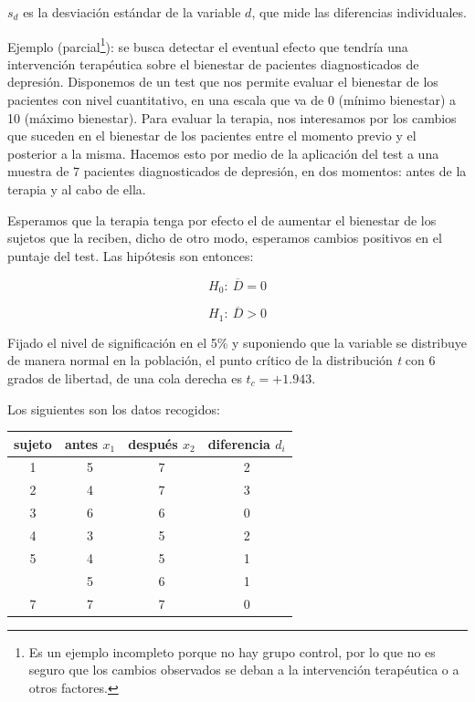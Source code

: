 \documentclass[]{book}
\let\rmarkdownfootnote\footnote%
\def\footnote{\protect\rmarkdownfootnote}
\begin{document}
\(s_{d}\) es la desviación estándar de la variable \(d\), que mide las
diferencias individuales.

Ejemplo (parcial\footnote{Es un ejemplo incompleto porque no hay grupo control, por lo que no es seguro que los cambios observados se deban a la intervención terapéutica o a otros factores.}): se busca detectar el eventual efecto que
tendría una intervención terapéutica sobre el bienestar de pacientes
diagnosticados de depresión. Disponemos de un test que nos permite
evaluar el bienestar de los pacientes con nivel cuantitativo, en una
escala que va de 0 (mínimo bienestar) a 10 (máximo bienestar). Para
evaluar la terapia, nos interesamos por los cambios que suceden en el
bienestar de los pacientes entre el momento previo y el posterior a la
misma. Hacemos esto por medio de la aplicación del test a una muestra de
7 pacientes diagnosticados de depresión, en dos momentos: antes de la
terapia y al cabo de ella.

Esperamos que la terapia tenga por efecto el de aumentar el bienestar de
los sujetos que la reciben, dicho de otro modo, esperamos cambios
positivos en el puntaje del test. Las hipótesis son entonces:

\[H_{0}:\ \overline{D} = 0\]

\[H_{1}:\ \overline{D} > 0\]

Fijado el nivel de significación en el 5\% y suponiendo que la variable
se distribuye de manera normal en la población, el punto crítico de la
distribución \emph{t} con 6 grados de libertad, de una cola derecha es
\(t_{c} =+1.943\).

Los siguientes son los datos recogidos:

\begin{table}[H]
\centering
\begin{tabular}{cccc}
\toprule
sujeto & antes $x_1$ & después $x_2$ & diferencia $d_i$\\
\midrule
\rowcolor{gray!6}  1 & 5 & 7 & 2\\
2 & 4 & 7 & 3\\
\rowcolor{gray!6}  3 & 6 & 6 & 0\\
4 & 3 & 5 & 2\\
\rowcolor{gray!6}  5 & 4 & 5 & 1\\
\addlinespace
6 & 5 & 6 & 1\\
\rowcolor{gray!6}  7 & 7 & 7 & 0\\
\bottomrule
\end{tabular}
\end{table}
\end{document}
